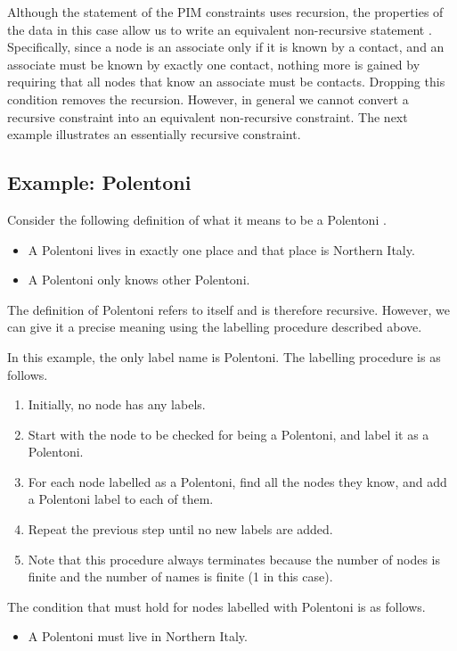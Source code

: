 \documentclass{article}
\begin{document}
Although the statement of the PIM constraints uses recursion, the properties of the data in this case allow us to
write an equivalent non-recursive statement \cite{peter:re-recursion}.
Specifically, since a node is an associate only if it is known by a contact, and an associate must be known by exactly one
contact, nothing more is gained by requiring that all nodes that know an associate must be contacts.
Dropping this condition removes the recursion.
However, in general we cannot convert a recursive constraint into an equivalent non-recursive constraint.
The next example illustrates an essentially recursive constraint.

\subsection{Example: Polentoni}
\label{sec-polentoni}
Consider the following definition of what it means to be a Polentoni \cite{peter:polentoni}.
\begin{itemize}
\item A Polentoni lives in exactly one place and that place is Northern Italy.
\item A Polentoni only knows other Polentoni.
\end{itemize}

The definition of Polentoni refers to itself and is therefore recursive.
However, we can give it a precise meaning using the labelling procedure described above.

In this example, the only label name is Polentoni. The labelling procedure is as follows.
\begin{enumerate}
\item Initially, no node has any labels.
\item Start with the node to be checked for being a Polentoni, and label it as a Polentoni.
\item For each node labelled as a Polentoni, find all the nodes they know, and add a Polentoni label to each of them.
\item Repeat the previous step until no new labels are added.
\item Note that this procedure always terminates because the number of nodes is finite and the number of names is finite (1 in this case).
\end{enumerate}

The condition that must hold for nodes labelled with Polentoni is as follows.
\begin{itemize}
\item A Polentoni must live in Northern Italy.
\end{itemize}
\end{document}
